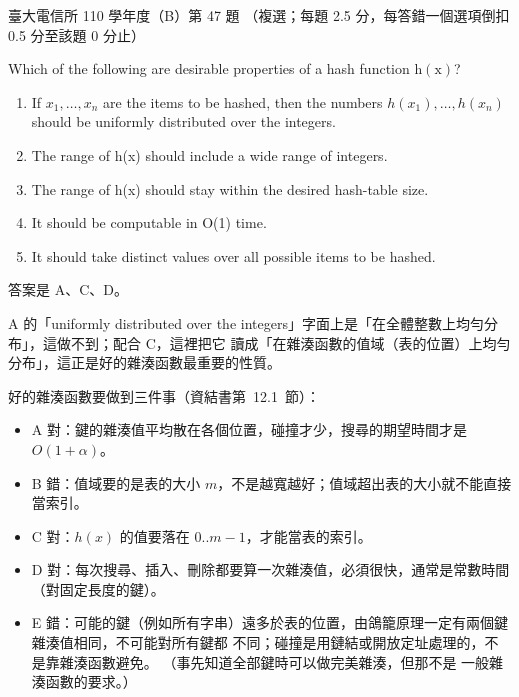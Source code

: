 \begin{pastexam}[label={px:ntu-110-comm-dsa-47}]{臺大電信所 110 學年度（B）第 47 題}
（複選；每題 2.5 分，每答錯一個選項倒扣 0.5 分至該題 0 分止）

Which of the following are desirable properties of a hash function $\mathrm{h(x)}$?
\begin{enumerate}[label=\Alph*.]
\item If $x_1,\ldots,x_n$ are the items to be hashed, then the numbers $h(x_1),\ldots,h(x_n)$ should be uniformly distributed over the integers.
\item The range of h(x) should include a wide range of integers.
\item The range of h(x) should stay within the desired hash-table size.
\item It should be computable in O(1) time.
\item It should take distinct values over all possible items to be hashed.
\end{enumerate}
\end{pastexam}

\begin{pastsoln}
答案是 A、C、D。

A 的「uniformly distributed over the integers」字面上是「在全體整數上均勻分布」，這做不到；配合 C，這裡把它
讀成「在雜湊函數的值域（表的位置）上均勻分布」，這正是好的雜湊函數最重要的性質。

好的雜湊函數要做到三件事（資結書第~12.1~節）：
\begin{itemize}
\item A 對：鍵的雜湊值平均散在各個位置，碰撞才少，搜尋的期望時間才是 $O(1 + \alpha)$。
\item B 錯：值域要的是表的大小 $m$，不是越寬越好；值域超出表的大小就不能直接當索引。
\item C 對：$h(x)$ 的值要落在 $0..m-1$，才能當表的索引。
\item D 對：每次搜尋、插入、刪除都要算一次雜湊值，必須很快，通常是常數時間（對固定長度的鍵）。
\item E 錯：可能的鍵（例如所有字串）遠多於表的位置，由鴿籠原理一定有兩個鍵雜湊值相同，不可能對所有鍵都
不同；碰撞是用鏈結或開放定址處理的，不是靠雜湊函數避免。 （事先知道全部鍵時可以做完美雜湊，但那不是
一般雜湊函數的要求。）
\end{itemize}
\end{pastsoln}
